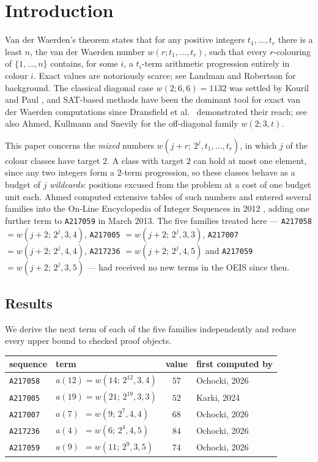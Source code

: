 \documentclass[12pt]{article}
\theoremstyle{remark}
\newcommand{\seq}[1]{\texttt{#1}}
\begin{document}
\section{Introduction}\label{sec:intro}

Van der Waerden's theorem \cite{vdw1927} states that for any positive
integers $t_1,\dots,t_r$ there is a least $n$, the van der Waerden number
$w(r;t_1,\dots,t_r)$, such that every $r$-colouring of $\{1,\dots,n\}$
contains, for some $i$, a $t_i$-term arithmetic progression entirely in
colour $i$. Exact values are notoriously scarce; see Landman and Robertson
\cite{landmanrobertson} for background. The classical diagonal case
$w(2;6,6)=1132$ was settled by Kouril and Paul \cite{kourilpaul}, and
SAT-based methods have been the dominant tool for exact van der Waerden
computations since Dransfield et al.\ \cite{dransfield} demonstrated their
reach; see also Ahmed, Kullmann and Snevily \cite{aks} for the off-diagonal
family $w(2;3,t)$.

This paper concerns the \emph{mixed} numbers
$w(j+r;\,2^j,t_1,\dots,t_r)$, in which $j$ of the colour classes have target
$2$. A class with target $2$ can hold at most one element, since any two
integers form a $2$-term progression, so these classes behave as a budget of
$j$ \emph{wildcards}: positions excused from the problem at a cost of one
budget unit each. Ahmed computed extensive tables of such numbers
\cite{ahmed2009,ahmed2010,ahmed2011,ahmed2013} and entered several families into the On-Line
Encyclopedia of Integer Sequences in 2012 \cite{oeis}, adding one further term to
\seq{A217059} in March 2013. The five families
treated here --- \seq{A217058} $=w(j+2;\,2^j,3,4)$, \seq{A217005}
$=w(j+2;\,2^j,3,3)$, \seq{A217007} $=w(j+2;\,2^j,4,4)$, \seq{A217236}
$=w(j+2;\,2^j,4,5)$ and \seq{A217059} $=w(j+2;\,2^j,3,5)$ --- had received no
new terms in the OEIS since then.

\subsection{Results}

We derive the next term of each of the five families independently and reduce
every upper bound to checked proof objects.

\begin{center}
\begin{tabular}{llcl}
\toprule
sequence & term & value & first computed by \\
\midrule
\seq{A217058} & $a(12) = w(14;\,2^{12},3,4)$ & $57$ & Ochocki, 2026 \cite{ochocki} \\
\seq{A217005} & $a(19) = w(21;\,2^{19},3,3)$ & $52$ & Karki, 2024 \cite{karki} \\
\seq{A217007} & $a(7) \;\,= w(9;\,2^{7},4,4)$ & $68$ & Ochocki, 2026 \cite{ochocki} \\
\seq{A217236} & $a(4) \;\,= w(6;\,2^{4},4,5)$ & $84$ & Ochocki, 2026 \cite{ochocki} \\
\seq{A217059} & $a(9) \;\,= w(11;\,2^{9},3,5)$ & $74$ & Ochocki, 2026 \cite{ochocki} \\
\bottomrule
\end{tabular}
\end{center}
\end{document}
